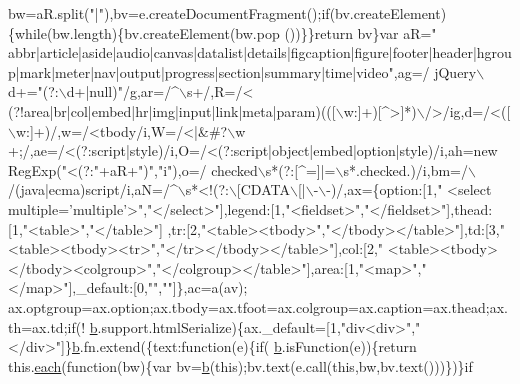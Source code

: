 \begin{DoxyCode}
      bw=aR.split(\textcolor{stringliteral}{"|"}),bv=e.createDocumentFragment();\textcolor{keywordflow}{if}(bv.createElement)\{\textcolor{keywordflow}{while}(bw.length)\{bv.createElement(bw.pop
      ())\}\}\textcolor{keywordflow}{return} bv\}var aR=\textcolor{stringliteral}{"
      abbr|article|aside|audio|canvas|datalist|details|figcaption|figure|footer|header|hgroup|mark|meter|nav|output|progress|section|summary|time|video"},ag=/ jQuery\(\backslash\)d+=\textcolor{stringliteral}{"(?:\(\backslash\)d+|null)"}/g,ar=/^\(\backslash\)s+/,R=/<
      (?!area|br|col|embed|hr|img|input|link|meta|param)(([\(\backslash\)w:]+)[^>]*)\(\backslash\)/>/ig,d=/<([\(\backslash\)w:]+)/,w=/<tbody/i,W=/<|&#?\(\backslash\)w
      +;/,ae=/<(?:script|style)/i,O=/<(?:script|\textcolor{keywordtype}{object}|embed|option|style)/i,ah=\textcolor{keyword}{new} RegExp(\textcolor{stringliteral}{"<(?:"}+aR+\textcolor{stringliteral}{")"},\textcolor{stringliteral}{"i"}),o=/
      checked\(\backslash\)s*(?:[^=]|=\(\backslash\)s*.checked.)/i,bm=/\(\backslash\)/(java|ecma)script/i,aN=/^\(\backslash\)s*<!(?:\(\backslash\)[CDATA\(\backslash\)[|\(\backslash\)-\(\backslash\)-)/,ax=\{option:[1,\textcolor{stringliteral}{"
      <select multiple='multiple'>"},\textcolor{stringliteral}{"</select>"}],legend:[1,\textcolor{stringliteral}{"<fieldset>"},\textcolor{stringliteral}{"</fieldset>"}],thead:[1,\textcolor{stringliteral}{"<table>"},\textcolor{stringliteral}{"</table>"}]
      ,tr:[2,\textcolor{stringliteral}{"<table><tbody>"},\textcolor{stringliteral}{"</tbody></table>"}],td:[3,\textcolor{stringliteral}{"<table><tbody><tr>"},\textcolor{stringliteral}{"</tr></tbody></table>"}],col:[2,\textcolor{stringliteral}{"
      <table><tbody></tbody><colgroup>"},\textcolor{stringliteral}{"</colgroup></table>"}],area:[1,\textcolor{stringliteral}{"<map>"},\textcolor{stringliteral}{"</map>"}],\_default:[0,\textcolor{stringliteral}{""},\textcolor{stringliteral}{""}]\},ac=a(av);
      ax.optgroup=ax.option;ax.tbody=ax.tfoot=ax.colgroup=ax.caption=ax.thead;ax.th=ax.td;\textcolor{keywordflow}{if}(!
      \hyperlink{a00039_aa4026ad5544b958e54ce5e106fa1c805}{b}.support.htmlSerialize)\{ax.\_default=[1,\textcolor{stringliteral}{"div<div>"},\textcolor{stringliteral}{"</div>"}]\}\hyperlink{a00039_aa4026ad5544b958e54ce5e106fa1c805}{b}.fn.extend(\{text:\textcolor{keyword}{function}(e)\{\textcolor{keywordflow}{if}(
      \hyperlink{a00039_aa4026ad5544b958e54ce5e106fa1c805}{b}.isFunction(e))\{\textcolor{keywordflow}{return} this.\hyperlink{a00039_a871ff39db627c54c710a3e9909b8234c}{each}(\textcolor{keyword}{function}(bw)\{var bv=\hyperlink{a00039_aa4026ad5544b958e54ce5e106fa1c805}{b}(\textcolor{keyword}{this});bv.text(e.call(\textcolor{keyword}{this},bw,bv.text()))\})\}\textcolor{keywordflow}{if}

\end{DoxyCode}
